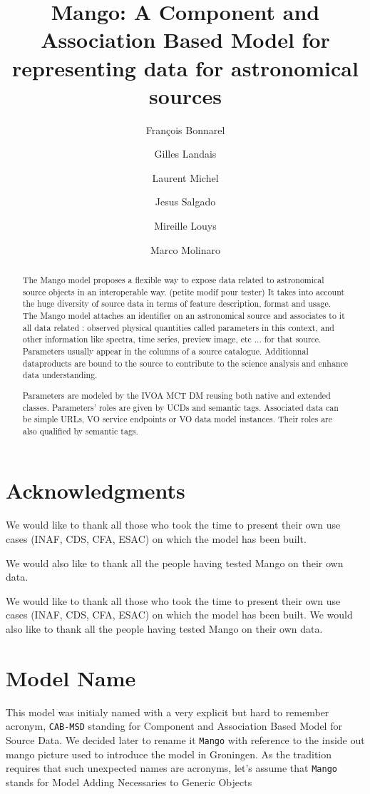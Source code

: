\documentclass[11pt,a4paper]{ivoa}
\title{Mango: A Component and Association Based Model for representing data for astronomical sources}
\author{François Bonnarel}
\author{Gilles Landais}
\author{Laurent Michel}
\author{Jesus Salgado}
\author{Mireille Louys}
\author{Marco Molinaro}
\begin{document}
\begin{abstract}
The Mango model proposes a flexible way to expose data related to astronomical source objects in an interoperable way. (petite modif pour tester)
It takes into account the huge diversity of source data in terms of feature description, format and usage. 
The Mango model attaches an identifier on an astronomical source and associates to it all data related : observed physical quantities called parameters in this context, and other information like spectra, time series, preview image, etc ... for that source. 
Parameters usually appear in the columns of a source catalogue. Additionnal dataproducts are bound to the source to contribute to the science analysis and enhance data understanding.

Parameters are modeled by the IVOA MCT DM reusing both native and extended classes. Parameters' roles are given by UCDs and semantic tags.
Associated data can be simple URLs, VO service endpoints or VO data model instances. Their roles are also qualified by semantic tags.

\end{abstract}


\section*{Acknowledgments}

We would like to thank all those who took the time to present their own use cases (INAF, CDS, CFA, ESAC) on which the model has been built.

We would also like to thank all the people having tested Mango on their own data.


We would like to thank all those who took the time to present their own use cases (INAF, CDS, CFA, ESAC) on which the model has been built.
We would also like to thank all the people having tested Mango on their own data.

\section*{Model Name}
This model was initialy named with a very explicit but hard to remember acronym, \texttt{CAB-MSD} standing for Component and Association Based Model for Source Data. We decided later to rename it \texttt{Mango} with reference to the inside out mango picture used to introduce the model in Groningen. As the tradition requires that such unexpected names are acronyms, let's assume that \texttt{Mango} stands for Model Adding Necessaries to Generic Objects
\end{document}
